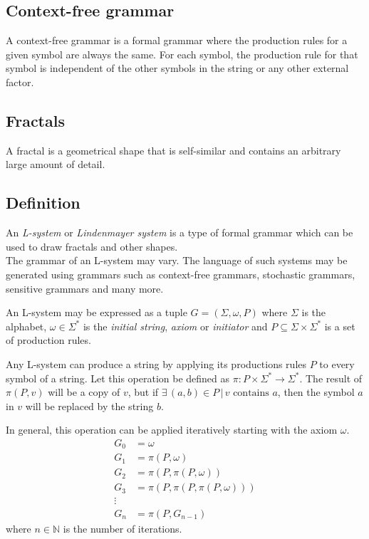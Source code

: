 \documentclass[a4paper]{article}
\begin{document}
\subsection{Context-free grammar}

A context-free grammar\cite{contextfreegrammar}
is a formal grammar where the production rules for a given symbol are always the same.
For each symbol, the production rule for that symbol is independent of the other symbols
in the string or any other external factor.

\subsection{Fractals}

A fractal\cite{fractal} is a geometrical shape that is self-similar
and contains an arbitrary large amount of detail.

\subsection{Definition}

An \textit{L-system}\cite{lsystem} or \textit{Lindenmayer system}
is a type of formal grammar which can be used to
draw fractals and other shapes. \\
The grammar of an L-system may vary.
The language of such systems may be generated using grammars such as context-free grammars,
stochastic grammars, sensitive grammars and many more.

An L-system may be expressed as a tuple
\(G=(\Sigma, \omega, P)\)
where \(\Sigma\) is the alphabet, \(\omega \in \Sigma^*\) is the
\textit{initial string}, \textit{axiom} or
\textit{initiator} and \(P \subseteq \Sigma \times \Sigma^*\) is a set of production rules.

Any L-system can produce a string by applying its productions
rules \(P\) to every symbol of a string.
Let this operation be defined as \(\pi:P\times \Sigma^* \to \Sigma^*\).
The result of \(\pi(P, v)\) will be a copy of \(v\),
but if \(\exists\, (a,b) \in P \,|\, v \text{ contains } a\), then the symbol \(a\)
in \(v\) will be replaced by the string \(b\).

In general, this operation can be applied iteratively starting with the axiom \(\omega\).
\begin{align*}
    G_0 &= \omega \\
    G_1 &= \pi(P, \omega) \\
    G_2 &= \pi(P, \pi(P, \omega)) \\
    G_3 &= \pi(P, \pi(P, \pi(P, \omega))) \\
    \vdots \\
    G_n &= \pi(P, G_{n-1})
\end{align*}
where \(n\in \mathbb{N}\) is the number of iterations.
\end{document}
